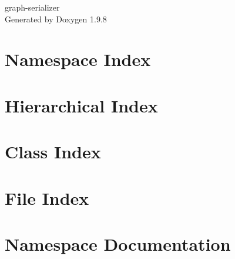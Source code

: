 \documentclass[twoside]{book}
\newcommand{\+}{\discretionary{\mbox{\scriptsize$\hookleftarrow$}}{}{}}
\newcommand{\clearemptydoublepage}{%
    \newpage{\pagestyle{empty}\cleardoublepage}%
  }
\begin{document}
  \raggedbottom
    \hypersetup{pageanchor=false,
                bookmarksnumbered=true,
                pdfencoding=unicode
               }
  \begin{titlepage}
  \vspace*{7cm}
  \begin{center}%
  {\Large graph-\/serializer}\\
  \vspace*{1cm}
  {\large Generated by Doxygen 1.9.8}\\
  \end{center}
  \end{titlepage}
  \clearemptydoublepage
  \tableofcontents
  \clearemptydoublepage
  \hypersetup{pageanchor=true}
\chapter{Namespace Index}

\chapter{Hierarchical Index}

\chapter{Class Index}

\chapter{File Index}

\chapter{Namespace Documentation}




\end{document}
